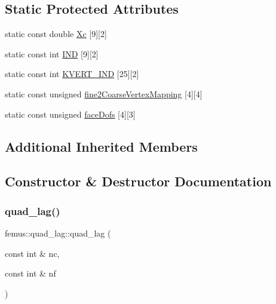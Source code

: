 \subsection*{Static Protected Attributes}
\begin{DoxyCompactItemize}
\item 
static const double \mbox{\hyperlink{classfemus_1_1quad__lag_a3fcb49b233c11257a280625908dd09e2}{Xc}} \mbox{[}9\mbox{]}\mbox{[}2\mbox{]}
\item 
static const int \mbox{\hyperlink{classfemus_1_1quad__lag_a34f640996694535e1a83b30fe1b7278b}{I\+ND}} \mbox{[}9\mbox{]}\mbox{[}2\mbox{]}
\item 
static const int \mbox{\hyperlink{classfemus_1_1quad__lag_a5ae93348d496923d4485ced9d39eca11}{K\+V\+E\+R\+T\+\_\+\+I\+ND}} \mbox{[}25\mbox{]}\mbox{[}2\mbox{]}
\item 
static const unsigned \mbox{\hyperlink{classfemus_1_1quad__lag_aa55b2e4ff3ef4f9cd8299bd83fe875be}{fine2\+Coarse\+Vertex\+Mapping}} \mbox{[}4\mbox{]}\mbox{[}4\mbox{]}
\item 
static const unsigned \mbox{\hyperlink{classfemus_1_1quad__lag_a553065a07c16dd12ec437f77cc2c2c3d}{face\+Dofs}} \mbox{[}4\mbox{]}\mbox{[}3\mbox{]}
\end{DoxyCompactItemize}
\subsection*{Additional Inherited Members}


\subsection{Constructor \& Destructor Documentation}
\mbox{\label{classfemus_1_1quad__lag_a6f57a109b73c719401a1f8d83caf33ed}} 
\subsubsection{\texorpdfstring{quad\+\_\+lag()}{quad\_lag()}}
{\footnotesize\ttfamily femus\+::quad\+\_\+lag\+::quad\+\_\+lag (\begin{DoxyParamCaption}\item[{const int \&}]{nc,  }\item[{const int \&}]{nf }\end{DoxyParamCaption})\hspace{0.3cm}{\ttfamily [inline]}}



